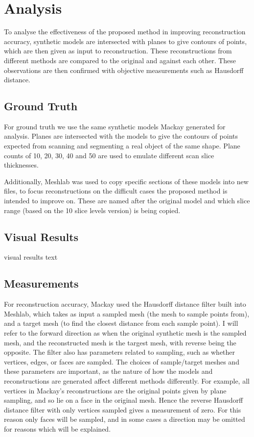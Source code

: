 \documentclass[11p, titlepage]{article}
\begin{document}
\section{Analysis}

To analyse the effectiveness of the proposed method in improving reconstruction accuracy, synthetic models are intersected with planes to give contours of points, which are then given as input to reconstruction. These reconstructions from different methods are compared to the original and against each other. These observations are then confirmed with objective measurements such as Hausdorff distance.

\subsection{Ground Truth}

For ground truth we use the same synthetic models Mackay generated for analysis. Planes are intersected with the models to give the contours of points expected from scanning and segmenting a real object of the same shape. Plane counts of 10, 20, 30, 40 and 50 are used to emulate different scan slice thicknesses.

Additionally, Meshlab was used to copy specific sections of these models into new files, to focus reconstructions on the difficult cases the proposed method is intended to improve on. These are named after the original model and which slice range (based on the 10 slice levels version) is being copied.

\subsection{Visual Results}

visual results text

\subsection{Measurements}

For reconstruction accuracy, Mackay used the Hausdorff distance filter built into Meshlab, which takes as input a sampled mesh (the mesh to sample points from), and a target mesh (to find the closest distance from each sample point). I will refer to the forward direction as when the original synthetic mesh is the sampled mesh, and the reconstructed mesh is the targest mesh, with reverse being the opposite. The filter also has parameters related to sampling, such as whether vertices, edges, or faces are sampled. The choices of sample/target meshes and these parameters are important, as the nature of how the models and reconstructions are generated affect different methods differently. For example, all vertices in Mackay's reconstructions are the original points given by plane sampling, and so lie on a face in the original mesh. Hence the reverse Hausdorff distance filter with only vertices sampled gives a measurement of zero. For this reason only faces will be sampled, and in some cases a direction may be omitted for reasons which will be explained.
\end{document}
